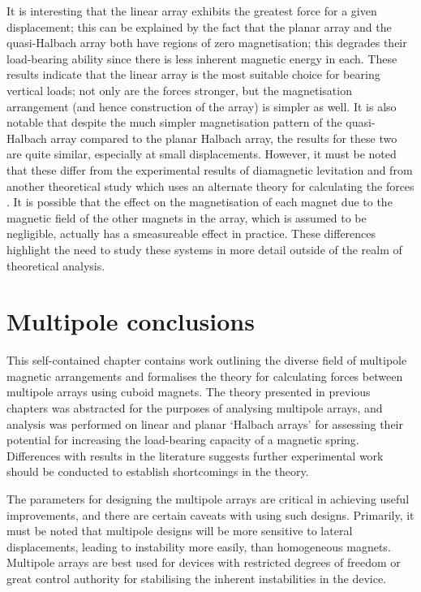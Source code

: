 \documentclass[11pt,a4paper]{memoir}
\begin{document}
It is interesting that the linear array exhibits the greatest force for a given displacement; this can be explained by the fact that the planar array and the quasi-Halbach array both have regions of zero magnetisation; this degrades their load-bearing ability since there is less inherent magnetic energy in each.
These results indicate that the linear array is the most suitable choice for bearing vertical loads; not only are the forces stronger, but the magnetisation arrangement (and hence construction of the array) is simpler as well.
It is also notable that despite the much simpler magnetisation pattern of the quasi-Halbach array compared to the planar Halbach array, the results for these two are quite similar, especially at small displacements.
However, it must be noted that these differ from the experimental results of diamagnetic levitation \cite{moser2002-maglev} and from another theoretical study which uses an alternate theory for calculating the forces \cite{campbell2002}.
It is possible that the effect on the magnetisation of each magnet due to the magnetic field of the other magnets in the array, which is assumed to be negligible, actually has a smeasureable effect in practice.
These differences highlight the need to study these systems in more detail outside of the realm of theoretical analysis.

\begin{figure}[htbp!]
\centering
{}
\end{figure}

\section{Multipole conclusions}

This self-contained chapter contains work outlining the diverse field of multipole magnetic arrangements and formalises the theory for calculating forces between multipole arrays using cuboid magnets.
The theory presented in previous chapters was abstracted for the purposes of analysing multipole arrays, and analysis was performed on linear and planar `Halbach arrays' for assessing their potential for increasing the load-bearing capacity of a magnetic spring.
Differences with results in the literature suggests further experimental work should be conducted to establish shortcomings in the theory.

The parameters for designing the multipole arrays are critical in achieving useful improvements, and there are certain caveats with using such designs.
Primarily, it must be noted that multipole designs will be more sensitive to lateral displacements, leading to instability more easily, than homogeneous magnets.
Multipole arrays are best used for devices with restricted degrees of freedom or great control authority for stabilising the inherent instabilities in the device.
\end{document}
